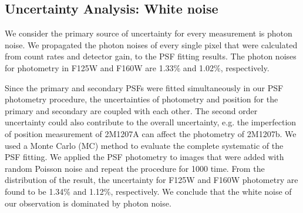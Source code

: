 \documentclass[apj]{emulateapj}
\begin{document}






\subsection{Uncertainty Analysis: White noise}
We consider the primary source of uncertainty for every measurement is
photon noise. We propagated the photon noises of every single pixel
that were calculated from count rates and detector gain, to the PSF
fitting results. The photon noises for photometry in F125W and F160W
are 1.33\% and 1.02\%, respectively.

Since the primary and secondary PSFs were fitted simultaneously in our
PSF photometry procedure, the uncertainties of photometry and position
for the primary and secondary are coupled with each other. The second
order uncertainty could also contribute to the overall uncertainty,
e.g. the imperfection of position measurement of 2M1207A can affect
the photometry of 2M1207b. We used a Monte Carlo (MC) method to evaluate the complete systematic of the
PSF fitting. We applied the PSF photometry to images that
were added with random Poisson noise and repeat the procedure for 1000
time. From the distribution of the result, the uncertainty for F125W
and F160W photometry are found to be 1.34\% and 1.12\%,
respectively. We conclude that the white noise of our observation is
dominated by photon noise. 
\end{document}

